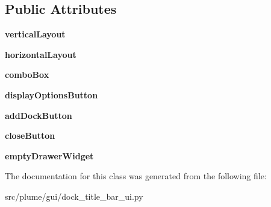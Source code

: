 \subsection*{Public Attributes}
\begin{DoxyCompactItemize}
\item 
{\bfseries vertical\+Layout}\hypertarget{classplume-creator_1_1src_1_1plume_1_1gui_1_1dock__title__bar__ui_1_1_ui___dock_title_bar_a94e430e8e840ba7eec8287bfdf9d42e3}{}\label{classplume-creator_1_1src_1_1plume_1_1gui_1_1dock__title__bar__ui_1_1_ui___dock_title_bar_a94e430e8e840ba7eec8287bfdf9d42e3}

\item 
{\bfseries horizontal\+Layout}\hypertarget{classplume-creator_1_1src_1_1plume_1_1gui_1_1dock__title__bar__ui_1_1_ui___dock_title_bar_ab91d3275c4db615fd2a76292449ddcd2}{}\label{classplume-creator_1_1src_1_1plume_1_1gui_1_1dock__title__bar__ui_1_1_ui___dock_title_bar_ab91d3275c4db615fd2a76292449ddcd2}

\item 
{\bfseries combo\+Box}\hypertarget{classplume-creator_1_1src_1_1plume_1_1gui_1_1dock__title__bar__ui_1_1_ui___dock_title_bar_a1e701d4f05f916dfb34730aeee657673}{}\label{classplume-creator_1_1src_1_1plume_1_1gui_1_1dock__title__bar__ui_1_1_ui___dock_title_bar_a1e701d4f05f916dfb34730aeee657673}

\item 
{\bfseries display\+Options\+Button}\hypertarget{classplume-creator_1_1src_1_1plume_1_1gui_1_1dock__title__bar__ui_1_1_ui___dock_title_bar_af6ff4f4629e0b7fa461633b11b685e3b}{}\label{classplume-creator_1_1src_1_1plume_1_1gui_1_1dock__title__bar__ui_1_1_ui___dock_title_bar_af6ff4f4629e0b7fa461633b11b685e3b}

\item 
{\bfseries add\+Dock\+Button}\hypertarget{classplume-creator_1_1src_1_1plume_1_1gui_1_1dock__title__bar__ui_1_1_ui___dock_title_bar_a278ce1a3804d873e5f1caabad8ccf124}{}\label{classplume-creator_1_1src_1_1plume_1_1gui_1_1dock__title__bar__ui_1_1_ui___dock_title_bar_a278ce1a3804d873e5f1caabad8ccf124}

\item 
{\bfseries close\+Button}\hypertarget{classplume-creator_1_1src_1_1plume_1_1gui_1_1dock__title__bar__ui_1_1_ui___dock_title_bar_a3739cee4b147ae07d55254ac3d76084c}{}\label{classplume-creator_1_1src_1_1plume_1_1gui_1_1dock__title__bar__ui_1_1_ui___dock_title_bar_a3739cee4b147ae07d55254ac3d76084c}

\item 
{\bfseries empty\+Drawer\+Widget}\hypertarget{classplume-creator_1_1src_1_1plume_1_1gui_1_1dock__title__bar__ui_1_1_ui___dock_title_bar_abab9ab1e18d218ab10f076b2e443f785}{}\label{classplume-creator_1_1src_1_1plume_1_1gui_1_1dock__title__bar__ui_1_1_ui___dock_title_bar_abab9ab1e18d218ab10f076b2e443f785}

\end{DoxyCompactItemize}


The documentation for this class was generated from the following file\+:\begin{DoxyCompactItemize}
\item 
src/plume/gui/dock\+\_\+title\+\_\+bar\+\_\+ui.\+py\end{DoxyCompactItemize}
